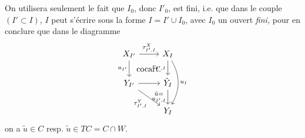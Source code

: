 On utilisera seulement le fait que $I_0$, donc $I'_0$, est fini, i.e. que dans le couple $(I' \subset I)$, $I$ peut s'écrire sous la forme $I = I' \cup I_0$, avec $I_0$ un ouvert \textit{fini,} pour en conclure que dans le diagramme
\[
\begin{tikzcd}
X_{I'} \arrow[r, "\tau^X_{I',I}"] \arrow[d, "u_{I'}"'] \arrow[dr, phantom, "\cocart"] & X_I \arrow[d, "v_{I',I}"'] \arrow[dd, bend left=30, "u_I"] \\
Y_{I'} \arrow[r] \arrow[dr, "\tau^Y_{I',I}"'] & \tilde{Y}_I \arrow[d, "\substack{\tilde{u} =\\ u_{I',I}}"'] \\
& Y_I
\end{tikzcd}
\]
on a $\tilde{u} \in C$ resp. $\tilde{u} \in TC = C \cap W$.


